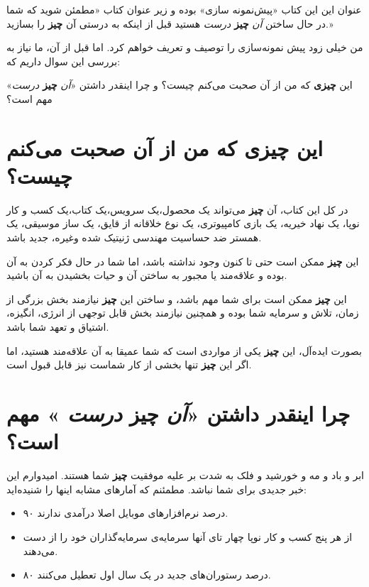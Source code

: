عنوان این این کتاب «پیش‌نمونه سازی» بوده و زیر عنوان کتاب «مطمئن شوید که
شما در حال ساختن \emph{آن} \textbf{چیز} \emph{درست} هستید قبل از اینکه
به درستی آن \textbf{چیز} را بسازید.»

من خیلی زود پیش نمونه‌سازی را توصیف و تعریف خواهم کرد. اما قبل از آن، ما
نیاز به بررسی این سوال داریم که:

این \textbf{چیزی} که من از آن صحبت می‌کنم چیست؟ و چرا اینقدر داشتن
«\emph{آن} \textbf{چیز} \emph{درست}» مهم است؟

\section{این \textbf{چیزی} که من از آن صحبت می‌کنم
چیست؟}\label{ux627ux6ccux646-ux686ux6ccux632ux6cc-ux6a9ux647-ux645ux646-ux627ux632-ux622ux646-ux635ux62dux628ux62a-ux645ux6ccux6a9ux646ux645-ux686ux6ccux633ux62a}

در کل این کتاب، آن \textbf{چیز} می‌تواند یک محصول،یک سرویس،یک کتاب،یک
کسب و کار نوپا، یک نهاد خیریه، یک بازی کامپیوتری، یک نوع خلاقانه از
قایق، یک ساز موسیقی، یک همستر ضد حساسیت مهندسی ژنیتیک شده وغیره، جدید
باشد.

این \textbf{چیز} ممکن است حتی تا کنون وجود نداشته باشد، اما شما در حال
فکر کردن به آن بوده و علاقه‌مند یا مجبور به ساختن آن و حیات بخشیدن به آن
باشید.

این \textbf{چیز} ممکن است برای شما مهم باشد، و ساختن این \textbf{چیز}
نیازمند بخش بزرگی از زمان، تلاش و سرمایه شما بوده و همچنین نیازمند بخش
قابل توجهی از انرژی، انگیزه، اشتیاق و تعهد شما باشد.

بصورت ایده‌آل، این \textbf{چیز} یکی از مواردی است که شما عمیقا به آن
علاقه‌مند هستید، اما اگر این \textbf{چیز} تنها بخشی از کار شماست نیز
قابل قبول است.

\section{چرا اینقدر داشتن «\emph{آن} \textbf{چیز} \emph{درست} » مهم
است؟}\label{ux686ux631ux627-ux627ux6ccux646ux642ux62fux631-ux62fux627ux634ux62aux646-ux622ux646-ux686ux6ccux632-ux62fux631ux633ux62a-ux645ux647ux645-ux627ux633ux62a}

ابر و باد و مه و خورشید و فلک به شدت بر علیه موفقیت \textbf{چیز} شما
هستند. امیدوارم این خبر جدیدی برای شما نباشد. مطمئنم که آمارهای مشابه
اینها را شنیده‌اید:

\begin{itemize}

\item
  ۹۰ درصد نرم‌افزارهای موبایل اصلا درآمدی ندارند.
\item
  از هر پنج کسب و کار نوپا چهار تای آنها سرمایه‌ی سرمایه‌گذاران خود را
  از دست می‌دهند.
\item
  ۸۰ درصد رستوران‌های جدید در یک سال اول تعطیل می‌کنند.
\end{itemize}

